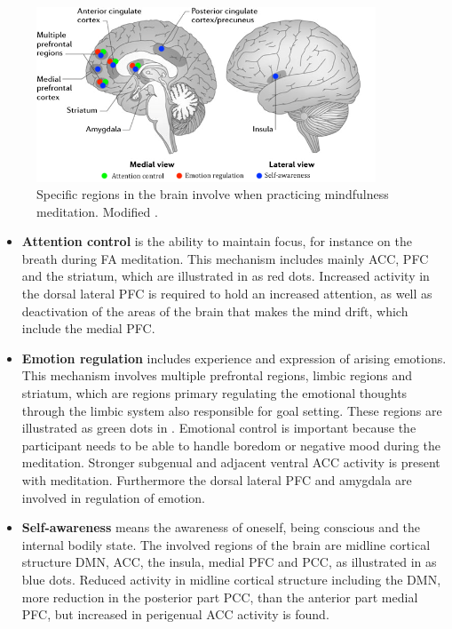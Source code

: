 \begin{figure}[H]
	\includegraphics[width=0.9\textwidth]{figures/brain_meditation.png} 
	\caption{Specific regions in the brain involve when practicing mindfulness meditation. Modified \cite{Tang2017}.}
	\label{fig:brain_meditation}  
\end{figure}

  
\begin{itemize}
	\item \textbf{Attention control} is the ability to maintain focus, for instance on the breath during FA meditation. This mechanism includes mainly ACC, PFC and the striatum, which are illustrated in  as red dots. Increased activity in the dorsal lateral PFC is required to hold an increased attention, as well as deactivation of the areas of the brain that makes the mind drift, which include the medial PFC. \cite{Tang2017}
	\item \textbf{Emotion regulation} includes experience and expression of arising emotions. This mechanism involves multiple prefrontal regions, limbic regions and striatum, which are regions primary regulating the emotional thoughts through the limbic system also responsible for goal setting. These regions are illustrated as green dots in . Emotional control is important because the participant needs to be able to handle boredom or negative mood during the meditation. Stronger subgenual and adjacent ventral ACC activity is present with meditation. Furthermore the dorsal lateral PFC and amygdala are involved in regulation of emotion. \cite{Tang2017}
	\item \textbf{Self-awareness} means the awareness of oneself, being conscious and the internal bodily state. The involved regions of the brain are midline cortical structure DMN, ACC, the insula, medial PFC and PCC, as illustrated in  as blue dots. Reduced activity in midline cortical structure including the DMN, more reduction in the posterior part PCC, than the anterior part medial PFC, but increased in perigenual ACC activity is found.  \cite{Tang2017}
\end{itemize}


